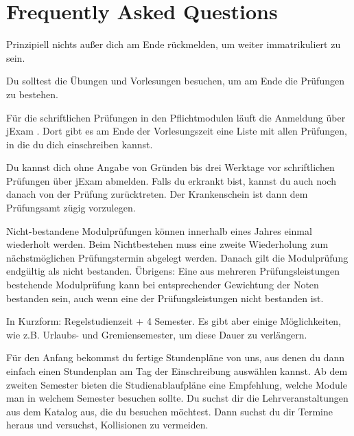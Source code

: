 \newcommand{\fancypageref}[1] {%
    \changemenucolor{gray}{br}{named}{fancypageref_color}%
    \changemenucolor{gray}{txt}{named}{fancypageref_color}%
    \keys{Seite \pageref{#1}}%
    \changemenucolor{gray}{br}{named}{ese_bg_color}%
    \changemenucolor{gray}{txt}{named}{ese_bg_color}%
}

\chapter*{Frequently Asked Questions}
\label{sec:faq}
Prinzipiell nichts außer dich am Ende rückmelden, um weiter immatrikuliert zu sein.

Du solltest die Übungen und Vorlesungen besuchen, um am Ende die Prüfungen zu bestehen.

Für die schriftlichen Prüfungen in den Pflichtmodulen läuft die Anmeldung über jExam . 
Dort gibt es am Ende der Vorlesungszeit eine Liste mit allen Prüfungen, in die du dich einschreiben kannst.

Du kannst dich ohne Angabe von Gründen bis drei Werktage vor schriftlichen Prüfungen über jExam abmelden. Falls du erkrankt bist, kannst du auch noch danach von der Prüfung zurücktreten. Der Krankenschein ist dann dem Prüfungsamt zügig vorzulegen. 

Nicht-bestandene Modulprüfungen können innerhalb eines Jahres einmal wiederholt werden. Beim Nichtbestehen muss eine zweite Wiederholung zum nächstmöglichen Prüfungstermin abgelegt werden. Danach gilt die Modulprüfung endgültig als nicht bestanden. Übrigens: Eine aus mehreren Prüfungsleistungen bestehende Modulprüfung kann bei entsprechender Gewichtung der Noten bestanden sein, auch wenn eine der Prüfungsleistungen nicht bestanden ist.

In Kurzform: Regelstudienzeit + 4 Semester. Es gibt aber einige Möglichkeiten, wie z.B. Urlaubs- und Gremiensemester, um diese Dauer zu verlängern.

Für den Anfang bekommst du fertige Stundenpläne von uns, aus denen du dann einfach einen Stundenplan am Tag der Einschreibung auswählen kannst. Ab dem zweiten Semester bieten die Studienablaufpläne eine Empfehlung, welche Module man in welchem Semester besuchen sollte. Du suchst dir die Lehrveranstaltungen aus dem Katalog aus, die du besuchen möchtest. Dann suchst du dir Termine heraus und versuchst, Kollisionen zu vermeiden.

